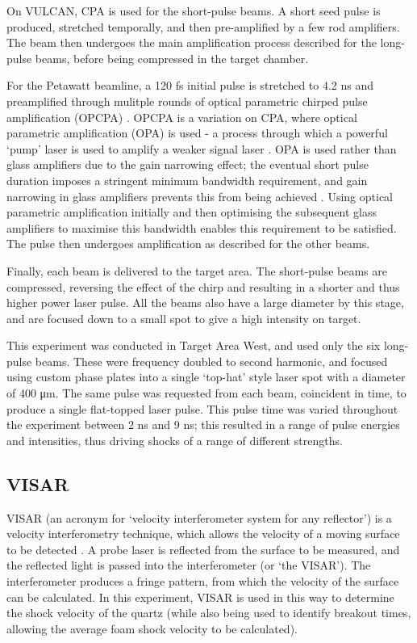 On VULCAN, CPA is used for the short-pulse beams. A short seed pulse is produced, stretched temporally, and then pre-amplified by a few rod amplifiers. The beam then undergoes the main amplification process described for the long-pulse beams, before being compressed in the target chamber.

For the Petawatt beamline, a 120 \unit{\femto\second} initial pulse is stretched to 4.2 \unit{\nano\second} \cite{Hernandez-Gomez2006} and preamplified through mulitple rounds of optical parametric chirped pulse amplification (OPCPA) \cite{Musgrave2015}. OPCPA is a variation on CPA, where optical parametric amplification (OPA) is used - a process through which a powerful `pump' laser is used to amplify a weaker signal laser \cite{Ross1997}. OPA is used rather than glass amplifiers due to the gain narrowing effect; the eventual short pulse duration imposes a stringent minimum bandwidth requirement, and gain narrowing in glass amplifiers prevents this from being achieved \cite{Danson2004}. Using optical parametric amplification initially and then optimising the subsequent glass amplifiers to maximise this bandwidth enables this requirement to be satisfied. The pulse then undergoes amplification as described for the other beams.

Finally, each beam is delivered to the target area. The short-pulse beams are compressed, reversing the effect of the chirp and resulting in a shorter and thus higher power laser pulse. All the beams also have a large diameter by this stage, and are focused down to a small spot to give a high intensity on target.

This experiment was conducted in Target Area West, and used only the six long-pulse beams. These were frequency doubled to second harmonic, and focused using custom phase plates into a single `top-hat' style laser spot with a diameter of 400 \unit{\micro\meter}. The same pulse was requested from each beam, coincident in time, to produce a single flat-topped laser pulse. This pulse time was varied throughout the experiment between 2 \unit{\nano\second} and 9 \unit{\nano\second}; this resulted in a range of pulse energies and intensities, thus driving shocks of a range of different strengths.

\subsection{VISAR}

VISAR (an acronym for `velocity interferometer system for any reflector') is a velocity interferometry technique, which allows the velocity of a moving surface to be detected \cite{Barker2000, Barker1972}. A probe laser is reflected from the surface to be measured, and the reflected light is passed into the interferometer (or `the VISAR'). The interferometer produces a fringe pattern, from which the velocity of the surface can be calculated. In this experiment, VISAR is used in this way to determine the shock velocity of the quartz (while also being used to identify breakout times, allowing the average foam shock velocity to be calculated).

